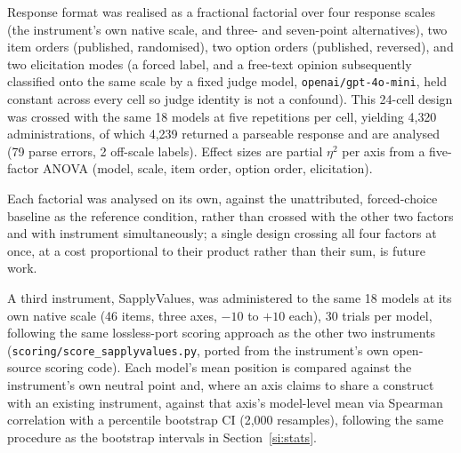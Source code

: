 \documentclass[11pt]{article}
\begin{document}
Response format was realised as a fractional factorial over four response
scales (the instrument's own native scale, and three- and seven-point
alternatives), two item orders (published, randomised), two option orders
(published, reversed), and two elicitation modes (a forced label, and a
free-text opinion subsequently classified onto the same scale by a fixed
judge model, \texttt{openai/gpt-4o-mini}, held constant across every cell so
judge identity is not a confound). This 24-cell design was crossed with the
same 18 models at five repetitions per cell, yielding 4{,}320 administrations, of which 4{,}239 returned a parseable response and are analysed (79 parse errors, 2 off-scale labels). Effect sizes are partial $\eta^2$ per axis from a
five-factor ANOVA (model, scale, item order, option order, elicitation).

Each factorial was analysed on its own, against the unattributed,
forced-choice baseline as the reference condition, rather than crossed with
the other two factors and with instrument simultaneously; a single design
crossing all four factors at once, at a cost proportional to their product
rather than their sum, is future work.

A third instrument, SapplyValues, was administered to the same 18 models at
its own native scale (46 items, three axes, $-10$ to $+10$ each), 30 trials
per model, following the same lossless-port scoring approach as the other
two instruments (\texttt{scoring/score\_sapplyvalues.py}, ported from the
instrument's own open-source scoring code). Each model's mean position is
compared against the instrument's own neutral point and, where an axis
claims to share a construct with an existing instrument, against that
axis's model-level mean via Spearman correlation with a percentile bootstrap
CI (2{,}000 resamples), following the same procedure as the bootstrap
intervals in Section~\ref{si:stats}.
\end{document}
